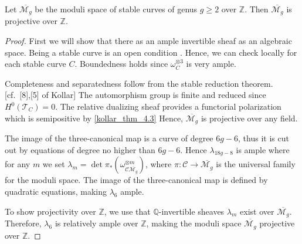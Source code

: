 \begin{lemma}
Let $\overline{\mathcal{M}_g}$ be the moduli space of stable curves of genus $g\geq 2$ over $\mathbb{Z}$. Then $\overline{\mathcal{M}_g}$ is projective over $\mathbb{Z}$.
\end{lemma}
\begin{proof}
First we will show that there as an ample invertible sheaf as an algebraic space. Being a stable curve is an open condition \cite[Tag 0E76]{stacks-project}. Hence, we can check locally for each stable curve $C$. Boundedness holds since $\omega_C^{\otimes 3}$ is very ample.

Completeness and separatedness follow from the stable reduction theorem.\cite[Tag 0E8C]{stacks-project} [cf.\ {[8],[5]  of Kollar}]  The automorphism group is finite and reduced since $H^0(\mathcal{T}_C)=0$.\cite[Tag 0E69]{stacks-project} The relative dualizing sheaf provides a functorial polarization which is semipositive by \ref{kollar_thm_4.3}  Hence, $\overline{\mathcal{M}_g}$ is projective over any field.

The image of the three-canonical map is a curve of degree $6g-6$, thus it is cut out by equations of degree no higher than $6g-6$. Hence $\lambda_{18g-8}$ is ample where for any $m$ we set $\lambda_m=\det \pi_*(\omega^{\otimes m}_{\mathcal{C}\overline{\mathcal{M}_g}})$, where $\pi:\mathcal{C}\to \overline{\mathcal{M}_g}$ is the universal family for the moduli space.  The image of the three-canonical map is defined by quadratic equations, making $\lambda_6$ ample.

To show projectivity over $\mathbb{Z}$, we use that $\mathbb{Q}$-invertible sheaves $\lambda_m$ exist over $\overline{\mathcal{M}_g}$. Therefore, $\lambda_6$ is relatively ample over $\mathbb{Z}$, making the moduli space $\overline{\mathcal{M}_g}$ projective over $\mathbb{Z}$.
\end{proof}





